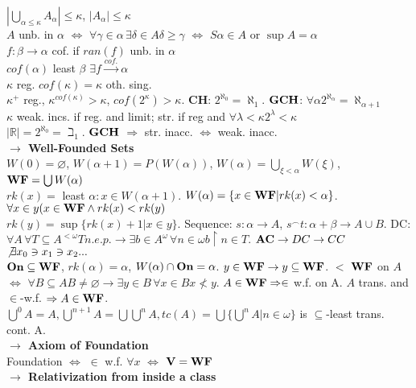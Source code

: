 \documentclass[9pt]{article}
\newcommand{\class}[1]{{\bf #1}}
\newcommand{\R}{\mathbb{R}}
\newcommand{\mytitle}[1]{ {\bf $\rightarrow$ #1}\\}
\newcommand{\On}{\class{On}}
\newcommand{\V}{\class{V}}
\newcommand{\WF}{\class{WF}}
\begin{document}
\begin{multicols*}{2}
$|\bigcup\limits_{\alpha\leqslant \kappa}A_\alpha|\leqslant\kappa$, $|A_\alpha|\leqslant\kappa$\\
$A$ unb. in $\alpha$ $\Leftrightarrow$ $\forall\gamma\in\alpha\,\exists\delta\in A\delta\geqslant\gamma$ $\Leftrightarrow$ $S\alpha\in A$ or $\sup A=\alpha$\\
$f\colon\beta\to\alpha$ cof. if $ran(f)$ unb. in $\alpha$\\
$cof(\alpha)$ least $\beta$ $\exists f\overset{cof.}{\to}\alpha$\\
$\kappa$ reg. $cof(\kappa)=\kappa$ oth. sing.\\
$\kappa^+$ reg., $\kappa^{cof(\kappa)}>\kappa$, $cof(2^\kappa)>\kappa$.
\class{CH}: $2^{\aleph_0}=\aleph_1$. $\class{GCH}$: $\forall\alpha 2^{\aleph_\alpha}=\aleph_{\alpha+1}$\\
$\kappa$ weak. incs. if reg. and limit; str. if reg and $\forall\lambda<\kappa 2^\lambda<\kappa$\\
$|\R|=2^{\aleph_0}=\beth_1$. $\class{GCH}$ $\Rightarrow$ str. inacc. $\Leftrightarrow$ weak. inacc.\\
\mytitle{Well-Founded Sets}
$W(0)=\varnothing$, $W(\alpha+1)=P(W(\alpha))$, $W(\alpha)=\bigcup\limits_{\xi<\alpha}W(\xi)$, $\WF=\bigcup\limits W(\alpha)$\\
$rk(x)=$ least $\alpha\colon x\in W(\alpha+1)$. $W(\alpha)=\{x\in \WF|rk(x)<\alpha\}$. $\forall x\in y (x\in \WF\wedge rk(x)<rk(y)$\\
$rk(y)=\sup\{rk(x)+1|x\in y\}$. Sequence: $s\colon\alpha\to A$, $s^\smallfrown t\colon \alpha+\beta\to A\cup B$.
DC: $\forall A\,\forall T\subseteq A^{<\omega} T n.e.p. \to \exists b\in A^\omega \,\forall n\in\omega b\upharpoonright n\in T$. $\class{AC}\to DC\to CC$\\
$\not\exists x_0\ni x_1\ni x_2...$\\ $\On\subseteq \WF$, $rk(\alpha)=\alpha$, $W(\alpha)\cap \On=\alpha$. $y\in \WF\to y\subseteq \WF$. $<$ $\WF$ on $A$ $\Leftrightarrow$ $\forall B\subseteq A B\neq \varnothing\to\exists y\in B\,\forall x\in B x\nless y$. $A\in \WF\Rightarrow \in$ w.f. on A. $A$ trans. and $\in$-w.f. $\Rightarrow A\in \WF$.\\
$\bigcup^0A=A,\bigcup^{n+1}A=\bigcup\bigcup^{n}A,tc(A)=\bigcup\{\bigcup^n A|n\in\omega\}$ is $\subseteq$-least trans. cont. A.\\
\mytitle{Axiom of Foundation}
Foundation $\Leftrightarrow$ $\in$ w.f. $\forall x$ $\Leftrightarrow$ $\V=\WF$\\
\mytitle{Relativization from inside a class}

\end{multicols*}
\end{document}
